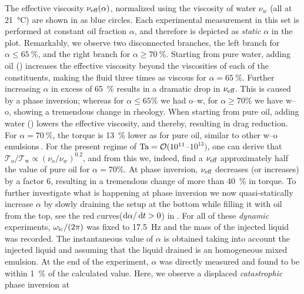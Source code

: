 \indent The effective viscosity $\nu_\text{eff}(\alpha)$, normalized using the viscosity of water $\nu_w$ (all at
\SI{21}{\celsius}) are shown in  as blue
circles.  Each experimental measurement in this set is performed at constant oil fraction  $\alpha$, and therefore is depicted as \emph{static} $\alpha$ in the plot. 
Remarkably, we observe two disconnected branches, the left
branch for $\alpha \leq \SI{65}{\percent}$, and the right branch for
$\alpha\geq \SI{70}{\percent}$.
%
Starting from pure water, adding oil () increases the effective
viscosity beyond the viscosities of each of the constituents, making the fluid
three times as viscous for $\alpha=\SI{65}{\percent}$.  Further increasing
$\alpha$ in excess of \SI{65}{\percent} results in a dramatic drop in $\nu_\text{eff}$.
This is caused by a phase inversion; whereas for $\alpha \leq 65\%$ we had
o--w, for $\alpha \geq 70\%$ we have w--o, showing a tremendous change in
rheology.
When starting from pure oil, adding water () lowers the effective
viscosity, and thereby, resulting in drag reduction.  For
$\alpha=\SI{70}{\percent}$, the torque is \SI{13}{\percent} lower as for pure
oil, similar to other w--o emulsions\,\cite{Pal1993}.  For the present regime
of $\text{Ta} = \mathcal{O}(10^{11}$--$10^{13})$, one can derive that
$\mathcal{T}_\text{o}/\mathcal{T}_\text{w} \propto (\nu_o/\nu_w)^{0.2}$, and
from this we, indeed, find a $\nu_\text{eff}$ approximately half the value of pure oil
for $\alpha=70\%$.
At phase inversion, $\nu_\text{eff}$ decreases (or increases) by a factor 6,
resulting in a tremendous change of more than \SI{40}{\percent} in torque.
To further investigate what is happening at phase inversion we now
quasi-statically increase $\alpha$ by slowly draining the setup at the bottom
while filling it with oil from the top, see the red
curves($\dif{\alpha}/\dif{t} > 0$) in .
For all of these \emph{dynamic} experiments, $\omega_\text{ic}/(2\pi)$ was fixed to
\SI{17.5}{\hertz} and the mass of the injected liquid was recorded.
The instantaneous value of $\alpha$ is obtained taking into account the injected liquid and assuming that the liquid drained is an homogeneous mixed emulsion.
At the end of the experiment, $\alpha$ was directly measured and found to be within
\SI{1}{\percent} of the calculated value.
Here, we observe a displaced \emph{catastrophic} phase inversion at
